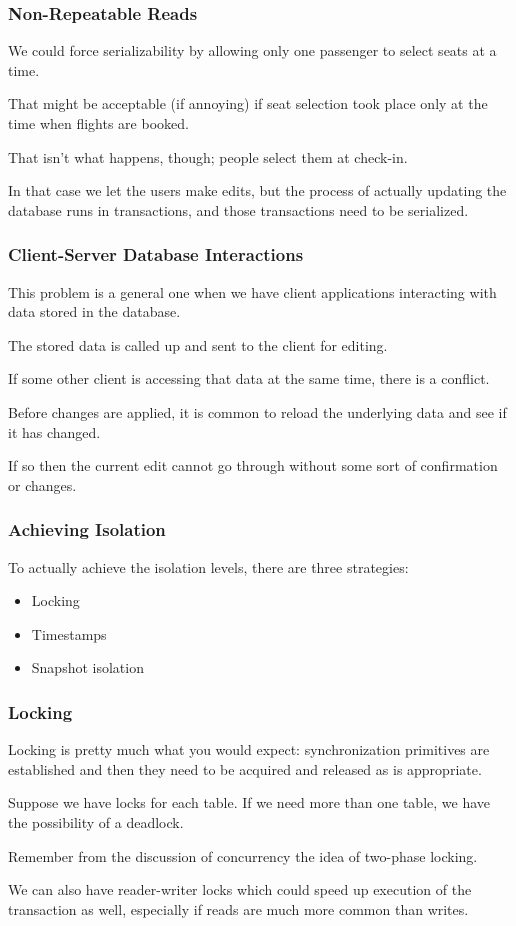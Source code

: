 \begin{frame}
\frametitle{Non-Repeatable Reads}

We could force serializability by allowing only one passenger to select seats at a time. 

That might be acceptable (if annoying) if seat selection took place only at the time when flights are booked. 

That isn't what happens, though; people select them at check-in. 

In that case we let the users make edits, but the process of actually updating the database runs in transactions, and those transactions need to be serialized. 

\end{frame}

\begin{frame}
\frametitle{Client-Server Database Interactions}

This problem is a general one when we have client applications interacting with data stored in the database. 

The stored data is called up and sent to the client for editing. 

If some other client is accessing that data at the same time, there is a conflict. 

Before changes are applied, it is common to reload the underlying data and see if it has changed. 

If so then the current edit cannot go through without some sort of confirmation or changes.

\end{frame}

\begin{frame}
\frametitle{Achieving Isolation}

To actually achieve the isolation levels, there are three strategies: 

\begin{itemize}
\item Locking 
\item Timestamps 
\item Snapshot isolation
\end{itemize}

\end{frame}

\begin{frame}
\frametitle{Locking}

Locking is pretty much what you would expect: synchronization primitives are established and then they need to be acquired and released as is appropriate.

Suppose we have locks for each table. If we need more than one table, we have the possibility of a deadlock. 

Remember from the discussion of concurrency the idea of two-phase locking. 


We can also have reader-writer locks which could speed up execution of the transaction as well, especially if reads are much more common than writes.

\end{frame}

